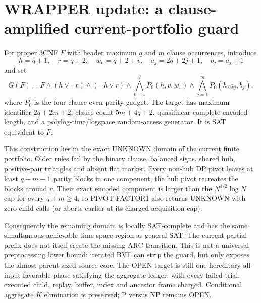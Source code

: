 \section{WRAPPER update: a clause-amplified current-portfolio guard}

For proper 3CNF $F$ with header maximum $q$ and $m$ clause occurrences,
introduce
\[
 h=q+1,\quad r=q+2,\quad w_v=q+2+v,\quad
 a_j=2q+2j+1,\quad b_j=a_j+1
\]
and set
\[
 G(F)=F\wedge(h\vee\neg r)\wedge(\neg h\vee r)
 \wedge\bigwedge_{v=1}^{q}P_0(h,v,w_v)
 \wedge\bigwedge_{j=1}^{m}P_0(h,a_j,b_j),
\]
where $P_0$ is the four-clause even-parity gadget.  The target has maximum
identifier $2q+2m+2$, clause count $5m+4q+2$, quasilinear complete encoded
length, and a polylog-time/logspace random-access generator.  It is SAT
equivalent to $F$.

This construction lies in the exact UNKNOWN domain of the current finite
portfolio.  Older rules fail by the binary clause, balanced signs, shared
hub, positive-pair triangles and absent flat marker.  Every non-hub DP pivot
leaves at least $q+m-1$ parity blocks in one component; the hub pivot
recreates the blocks around $r$.  Their exact encoded component is larger
than the $N^{1/2}\log N$ cap for every $q+m\ge4$, so
\textsc{PIVOT-FACTOR1} also returns UNKNOWN with zero child calls (or aborts
earlier at its charged acquisition cap).

Consequently the remaining domain is locally SAT-complete and has the same
simultaneous achievable time-space region as general SAT.  The current
partial prefix does not itself create the missing ARC transition.  This is
not a universal preprocessing lower bound: iterated BVE can strip the guard,
but only exposes the almost-parent-sized source core.  The OPEN target is
still one hereditary all-input favorable phase satisfying the aggregate
ledger, with every failed trial, executed child, replay, buffer, index and
ancestor frame charged.  Conditional aggregate $K$ elimination is preserved;
P versus NP remains OPEN.
